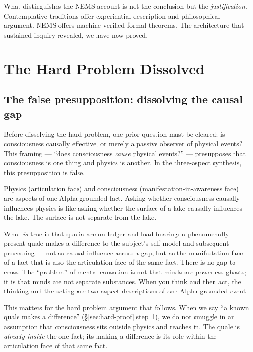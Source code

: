 \documentclass[11pt]{article}
\theoremstyle{remark}
\begin{document}
What distinguishes the NEMS account is not the conclusion but the
\emph{justification}. Contemplative traditions offer experiential description and
philosophical argument. NEMS offers machine-verified formal theorems. The architecture
that sustained inquiry revealed, we have now proved.

\section{The Hard Problem Dissolved}\label{sec:hard}

\subsection{The false presupposition: dissolving the causal gap}

Before dissolving the hard problem, one prior question must be cleared: is
consciousness causally effective, or merely a passive observer of physical events?
This framing --- ``does consciousness \emph{cause} physical events?'' ---
presupposes that consciousness is one thing and physics is another. In the
three-aspect synthesis, this presupposition is false.

Physics (articulation face) and consciousness (manifestation-in-awareness face) are
aspects of one Alpha-grounded fact. Asking whether consciousness causally influences
physics is like asking whether the surface of a lake causally influences the lake.
The surface is not separate from the lake.

What \emph{is} true is that qualia are on-ledger and load-bearing: a phenomenally
present quale makes a difference to the subject's self-model and subsequent
processing --- not as causal influence across a gap, but as the manifestation face
of a fact that is also the articulation face of the same fact. There is no gap to
cross. The ``problem'' of mental causation is not that minds are powerless ghosts;
it is that minds are not separate substances. When you think and then act, the
thinking and the acting are two aspect-descriptions of one Alpha-grounded event.

This matters for the hard problem argument that follows. When we say ``a known
quale makes a difference'' (\S\ref{sec:hard-proof} step~1), we do not smuggle in an
assumption that consciousness sits outside physics and reaches in. The quale is
\emph{already inside} the one fact; its making a difference is its role within the
articulation face of that same fact.
\end{document}
